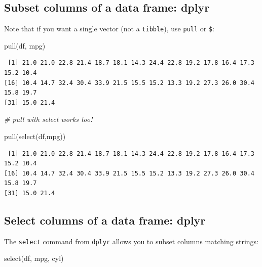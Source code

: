 \documentclass[
]{article}
\newenvironment{Shaded}{\begin{snugshade}}{\end{snugshade}}
\newcommand{\CommentTok}[1]{\textcolor[rgb]{0.56,0.35,0.01}{\textit{#1}}}
\newcommand{\FunctionTok}[1]{\textcolor[rgb]{0.00,0.00,0.00}{#1}}
\newcommand{\NormalTok}[1]{#1}
\begin{document}
\hypertarget{subset-columns-of-a-data-frame-dplyr-1}{%
\subsection{Subset columns of a data frame:
dplyr}\label{subset-columns-of-a-data-frame-dplyr-1}}

Note that if you want a single vector (not a \texttt{tibble}), use
\texttt{pull} or \texttt{\$}:

\begin{Shaded}
\begin{Highlighting}[]
\FunctionTok{pull}\NormalTok{(df, mpg)}
\end{Highlighting}
\end{Shaded}

\begin{verbatim}
 [1] 21.0 21.0 22.8 21.4 18.7 18.1 14.3 24.4 22.8 19.2 17.8 16.4 17.3 15.2 10.4
[16] 10.4 14.7 32.4 30.4 33.9 21.5 15.5 15.2 13.3 19.2 27.3 26.0 30.4 15.8 19.7
[31] 15.0 21.4
\end{verbatim}

\begin{Shaded}
\begin{Highlighting}[]
\CommentTok{\# pull with select works too!}

\FunctionTok{pull}\NormalTok{(}\FunctionTok{select}\NormalTok{(df,mpg))}
\end{Highlighting}
\end{Shaded}

\begin{verbatim}
 [1] 21.0 21.0 22.8 21.4 18.7 18.1 14.3 24.4 22.8 19.2 17.8 16.4 17.3 15.2 10.4
[16] 10.4 14.7 32.4 30.4 33.9 21.5 15.5 15.2 13.3 19.2 27.3 26.0 30.4 15.8 19.7
[31] 15.0 21.4
\end{verbatim}

\hypertarget{select-columns-of-a-data-frame-dplyr}{%
\subsection{Select columns of a data frame:
dplyr}\label{select-columns-of-a-data-frame-dplyr}}

The \texttt{select} command from \texttt{dplyr} allows you to subset
columns matching strings:

\begin{Shaded}
\begin{Highlighting}[]
\FunctionTok{select}\NormalTok{(df, mpg, cyl)}
\end{Highlighting}
\end{Shaded}
\end{document}
